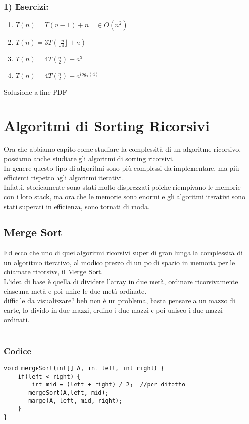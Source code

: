\documentclass[a4paper,12pt]{article}
\begin{document}
\subsubsection*{ 1) \textcolor{esercizio}{Esercizi:}}
\begin{enumerate}
    \item $T(n)  = T(n-1) + n \quad \in O(n^2)$    
    \item $T(n) = 3T(\lfloor \frac{n}{4} \rfloor + n)$
    \item $T(n) = 4T(\frac{n}{2}) + n^{3}$
    \item $T(n) = 4T(\frac{n}{2}) + n^{log_{2}(4)}$
\end{enumerate}
{\tiny{Soluzione a fine PDF}}


\section{Algoritmi di Sorting Ricorsivi}
Ora che abbiamo capito come studiare la complessità di un algoritmo ricorsivo, possiamo anche studiare gli algoritmi di sorting ricorsivi. \\ 
In genere questo tipo di algoritmi sono più complessi da implementare, ma più efficienti rispetto agli algoritmi iterativi. \\
Infatti, storicamente sono stati molto disprezzati poiche riempivano le memorie con i loro stack, ma ora che le memorie sono enormi e gli algoritmi iterativi sono stati superati in efficienza, sono tornati di moda. \\

\subsection{Merge Sort}
Ed ecco che uno di quei algoritmi ricorsivi super di gran lunga la complessità di un algoritmo iterativo, al modico prezzo di un po di spazio in memoria per le chiamate ricorsive, il Merge Sort. \\
L'idea di base è quella di dividere l'array in due metà, ordinare ricorsivamente ciascuna metà e poi unire le due metà ordinate. \\
difficile da visualizzare? beh non è un problema, basta pensare a un mazzo di carte, lo divido in due mazzi, ordino i due mazzi e poi unisco i due mazzi ordinati. \\
\\
\subsubsection{{\textcolor{codice}{Codice}}}  
\begin{lstlisting}[style=mystyle]
void mergeSort(int[] A, int left, int right) {
    if(left < right) {
        int mid = (left + right) / 2;  //per difetto 
       mergeSort(A,left, mid);
       marge(A, left, mid, right);
    }
}
\end{lstlisting}
\end{document}
